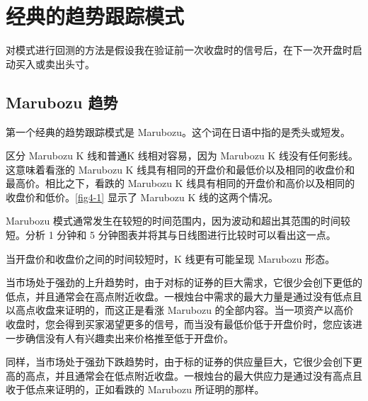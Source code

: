 \chapter{经典的趋势跟踪模式}
\begin{tcolorbox}
    对模式进行回测的方法是假设我在验证前一次收盘时的信号后，在下一次开盘时启动买入或卖出头寸。
\end{tcolorbox}
\section{Marubozu 趋势}
第一个经典的趋势跟踪模式是 Marubozu。这个词在日语中指的是秃头或短发。

区分 Marubozu K 线和普通K 线相对容易，因为 Marubozu K 线没有任何影线。这意味着看涨的 Marubozu K 线具有相同的开盘价和最低价以及相同的收盘价和最高价。相比之下，看跌的 Marubozu K 线具有相同的开盘价和高价以及相同的收盘价和低价。\autoref{fig4-1} 显示了 Marubozu K 线的这两个情况。


Marubozu 模式通常发生在较短的时间范围内，因为波动和超出其范围的时间较短。分析 1 分钟和 5 分钟图表并将其与日线图进行比较时可以看出这一点。
\begin{tcolorbox}
    当开盘价和收盘价之间的时间较短时，K 线更有可能呈现 Marubozu 形态。
\end{tcolorbox}

当市场处于强劲的上升趋势时，由于对标的证券的巨大需求，它很少会创下更低的低点，并且通常会在高点附近收盘。一根烛台中需求的最大力量是通过没有低点且以高点收盘来证明的，而这正是看涨 Marubozu 的全部内容。当一项资产以高价收盘时，您会得到买家渴望更多的信号，而当没有最低价低于开盘价时，您应该进一步确信没有人有兴趣卖出来价格推至低于开盘价。

同样，当市场处于强劲下跌趋势时，由于标的证券的供应量巨大，它很少会创下更高的高点，并且通常会在低点附近收盘。一根烛台的最大供应力是通过没有高点且收于低点来证明的，正如看跌的 Marubozu 所证明的那样。
\subsection*{}
